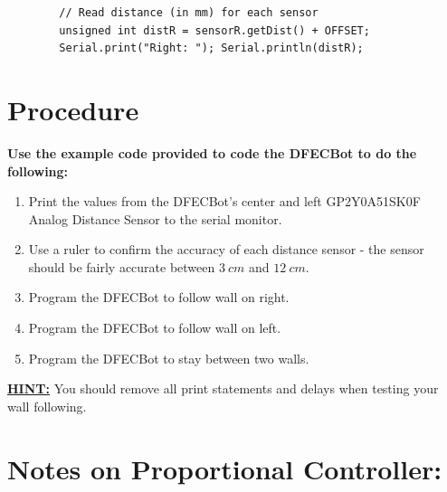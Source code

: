 \documentclass{handout}
\begin{document}
	\begin{lstlisting}
		// Read distance (in mm) for each sensor
		unsigned int distR = sensorR.getDist() + OFFSET;
		Serial.print("Right: "); Serial.println(distR);
	\end{lstlisting}
	
	\section{Procedure}
	\textbf{Use the example code provided to code the DFECBot to do the following:}
		
	\begin{enumerate}
		\item Print the values from the DFECBot's center and left GP2Y0A51SK0F Analog Distance Sensor to the serial monitor.
		\item Use a ruler to confirm the accuracy of each distance sensor - the sensor should be fairly accurate between $3\ cm$ and $12\ cm$.
		\item Program the DFECBot to follow wall on right.
		\item Program the DFECBot to follow wall on left.
		\item Program the DFECBot to stay between two walls.
	\end{enumerate} 	
	{\large \textbf{\underline{HINT:}}} You should remove all print statements and delays when testing your wall following.
	\section{Notes on Proportional Controller:}
	
\end{document}
